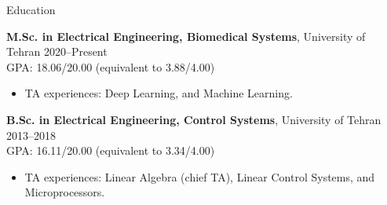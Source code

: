 \documentclass{resume} %
\begin{document}
	\vspace{-1.5em}
	\begin{rSection}{Education}
		
		{\bf M.Sc. in Electrical Engineering, Biomedical Systems}, University of Tehran \hfill {2020--Present}\\
		GPA: 18.06/20.00 (equivalent to 3.88/4.00)
		\begin{itemize}
			\item TA experiences: Deep Learning, and Machine Learning.
		\end{itemize}	


		
		{\bf B.Sc. in Electrical Engineering, Control Systems}, University of Tehran \hfill {2013--2018}\\
		GPA: 16.11/20.00 (equivalent to 3.34/4.00)
			\begin{itemize}
			\item TA experiences: Linear Algebra (chief TA), Linear Control Systems, and Microprocessors.
		\end{itemize}	
			
		
	\end{rSection}
	
\end{document}
